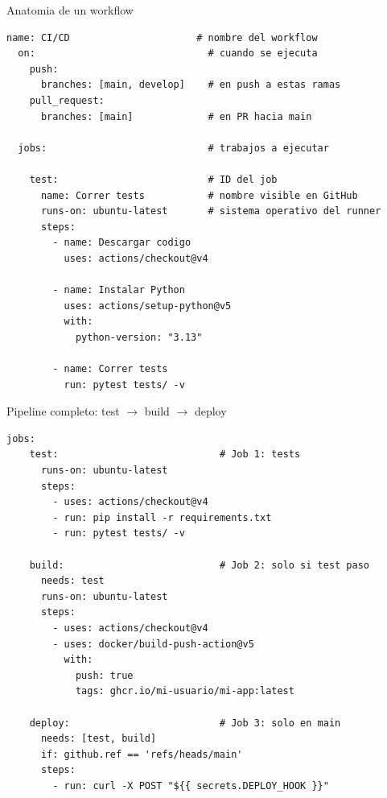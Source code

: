 \documentclass[aspectratio=169]{beamer}
\begin{document}
\begin{frame}[fragile]{Anatomia de un workflow}
\begin{lstlisting}[style=yaml, basicstyle=\ttfamily\scriptsize\color{white}]
  name: CI/CD                      # nombre del workflow
  on:                              # cuando se ejecuta
    push:
      branches: [main, develop]    # en push a estas ramas
    pull_request:
      branches: [main]             # en PR hacia main

  jobs:                            # trabajos a ejecutar

    test:                          # ID del job
      name: Correr tests           # nombre visible en GitHub
      runs-on: ubuntu-latest       # sistema operativo del runner
      steps:
        - name: Descargar codigo
          uses: actions/checkout@v4

        - name: Instalar Python
          uses: actions/setup-python@v5
          with:
            python-version: "3.13"

        - name: Correr tests
          run: pytest tests/ -v
  \end{lstlisting}
\end{frame}

\begin{frame}[fragile]{Pipeline completo: test $\to$ build $\to$ deploy}
\begin{lstlisting}[style=yaml, basicstyle=\ttfamily\scriptsize\color{white}]
  jobs:
    test:                            # Job 1: tests
      runs-on: ubuntu-latest
      steps:
        - uses: actions/checkout@v4
        - run: pip install -r requirements.txt
        - run: pytest tests/ -v

    build:                           # Job 2: solo si test paso
      needs: test
      runs-on: ubuntu-latest
      steps:
        - uses: actions/checkout@v4
        - uses: docker/build-push-action@v5
          with:
            push: true
            tags: ghcr.io/mi-usuario/mi-app:latest

    deploy:                          # Job 3: solo en main
      needs: [test, build]
      if: github.ref == 'refs/heads/main'
      steps:
        - run: curl -X POST "${{ secrets.DEPLOY_HOOK }}"
  \end{lstlisting}
\end{frame}
\end{document}
